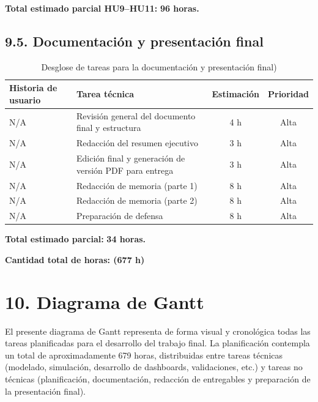 \documentclass[
11pt, %
]{charter}
\begin{document}
\vspace{0.5cm}
\noindent
\textbf{Total estimado parcial HU9–HU11:} \textbf{96 horas.}

\subsection*{9.5. Documentación y presentación final}

\begin{table}[H]
\centering
\begin{tabular}{|l|p{6cm}|c|c|}
\hline
\textbf{Historia de usuario} & \textbf{Tarea técnica} & \textbf{Estimación} & \textbf{Prioridad} \\
\hline
N/A & Revisión general del documento final y estructura & 4 h & Alta \\
N/A & Redacción del resumen ejecutivo & 3 h & Alta \\
N/A & Edición final y generación de versión PDF para entrega & 3 h & Alta \\
N/A & Redacción de memoria (parte 1) & 8 h & Alta \\
N/A & Redacción de memoria (parte 2) & 8 h & Alta \\
N/A & Preparación de defensa & 8 h & Alta \\
\hline
\end{tabular}
\caption{Desglose de tareas para la documentación y presentación final)}
\end{table}

\vspace{0.5cm}
\noindent
\textbf{Total estimado parcial:} \textbf{34 horas.}

\vspace{0.2cm}
\noindent\dotfill

\vspace{0.5cm}
\noindent
\textbf{Cantidad total de horas: (677 h)}

\vspace{0.2cm}
\noindent\dotfill

\section{10. Diagrama de Gantt}
\label{sec:gantt}

El presente diagrama de Gantt representa de forma visual y cronológica todas las tareas planificadas para el desarrollo del trabajo final. La planificación contempla un total de aproximadamente 679 horas, distribuidas entre tareas técnicas (modelado, simulación, desarrollo de dashboards, validaciones, etc.) y tareas no técnicas (planificación, documentación, redacción de entregables y preparación de la presentación final).
\end{document}
